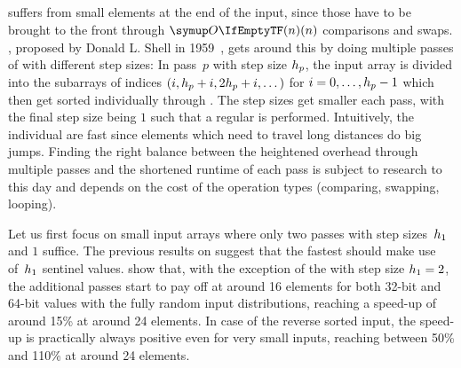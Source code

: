 \subsection{\texorpdfstring{\ShS{}}{ShellSort}}
\label{subsec:single:shell}


\IS{} suffers from small elements at the end of the input, since those have to be brought to the front through \(\bigoh{n}\) comparisons and swaps.
\ShS{}, proposed by Donald L. Shell in 1959~\cite{Shell1959AHS}, gets around this by doing multiple passes of \IS{} with different step sizes:
In pass~\(p\) with step size \(h_p\), the input array is divided into the subarrays of indices \((i, h_p + i, 2 h_p + i, \dots)\) for \(i = 0, \dots, h_p - 1\) which then get sorted individually through \IS{}.
The step sizes get smaller each pass, with the final step size being \(1\) such that a regular \IS{} is performed.
Intuitively, the individual \IS*{} are fast since elements which need to travel long distances do big jumps.
Finding the right balance between the heightened overhead through multiple \IS{} passes and the shortened runtime of each \IS{} pass is subject to research to this day \cite{skean2023optimization,lee2021empirically} and depends on the cost of the operation types (comparing, swapping, looping).

Let us first focus on small input arrays where only two passes with step sizes~\(h_1\) and \(1\) suffice.
The previous results on \IS{} suggest that the fastest \ShS{} should make use of~\(h_1\) sentinel values.
 show that, with the exception of the \ShS{} with step size \(h_1 = 2\), the additional passes start to pay off at around 16 elements for both 32-bit and 64-bit values with the fully random input distributions, reaching a speed-up of around 15\% at around 24 elements.
In case of the reverse sorted input, the speed-up is practically always positive even for very small inputs, reaching between 50\% and 110\% at around 24 elements.


